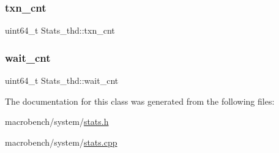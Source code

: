 \subsubsection{\texorpdfstring{txn\+\_\+cnt}{txn\_cnt}}
{\footnotesize\ttfamily uint64\+\_\+t Stats\+\_\+thd\+::txn\+\_\+cnt}

\mbox{\label{classStats__thd_af8910fbaa615ab9753db185927a5d169}} 
\subsubsection{\texorpdfstring{wait\+\_\+cnt}{wait\_cnt}}
{\footnotesize\ttfamily uint64\+\_\+t Stats\+\_\+thd\+::wait\+\_\+cnt}



The documentation for this class was generated from the following files\+:\begin{DoxyCompactItemize}
\item 
macrobench/system/\hyperlink{stats_8h}{stats.\+h}\item 
macrobench/system/\hyperlink{stats_8cpp}{stats.\+cpp}\end{DoxyCompactItemize}
